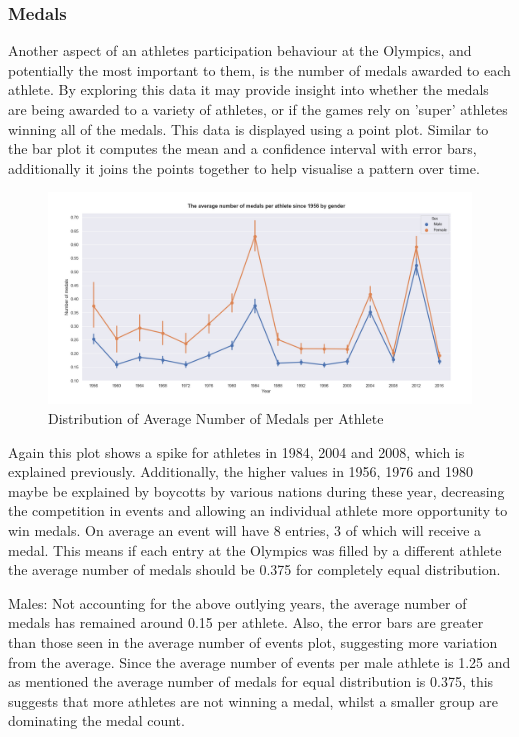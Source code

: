 \documentclass[a4 paper, 12pt]{article}
\begin{document}
        \subsubsection{Medals}
        Another aspect of an athletes participation behaviour at the Olympics, and potentially the most important to them, is the number of medals awarded to each athlete. By exploring this data it may provide insight into whether the medals are being awarded to a variety of athletes, or if the games rely on 'super' athletes winning all of the medals. This data is displayed using a point plot. Similar to the bar plot it computes the mean and a confidence interval with error bars, additionally it joins the points together to help visualise a pattern over time. 

        \begin{figure} [H]
            \centering
            \includegraphics[width=\textwidth, frame]
                {./images/graph/athlete_medal_pointplot.png}      
                \caption{Distribution of Average Number of Medals per Athlete} 
        \end{figure}
        Again this plot shows a spike for athletes in 1984, 2004 and 2008, which is explained previously. Additionally, the higher values in 1956, 1976 and 1980 maybe be explained by boycotts by various nations during these year, decreasing the competition in events and allowing an individual athlete more opportunity to win medals. On average an event will have 8 entries, 3 of which will receive a medal. This means if each entry at the Olympics was filled by a different athlete the average number of medals should be 0.375 for completely equal distribution.          

        Males: Not accounting for the above outlying years, the average number of medals has remained around 0.15 per athlete. Also, the error bars are greater than those seen in the average number of events plot, suggesting more variation from the average. Since the average number of events per male athlete is 1.25 and as mentioned the average number of medals for equal distribution is 0.375, this suggests that more athletes are not winning a medal, whilst a smaller group are dominating the medal count.
\end{document}
